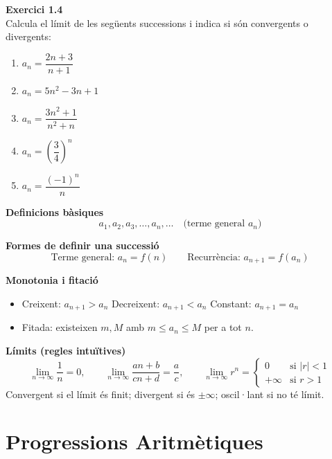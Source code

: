 \documentclass[12pt]{article}
\begin{document}
\begin{exercici}
\textbf{Exercici 1.4}\\
Calcula el límit de les següents successions i indica si són convergents o divergents:
\begin{enumerate}[label=\alph*)]
    \item $a_n = \dfrac{2n+3}{n+1}$
    \item $a_n = 5n^2 - 3n + 1$
    \item $a_n = \dfrac{3n^2 + 1}{n^2 + n}$
    \item $a_n = \left(\dfrac{3}{4}\right)^n$
    \item $a_n = \dfrac{(-1)^n}{n}$
\end{enumerate}
\end{exercici}

\begin{resum}[title=Resum 1: Successions]
\textbf{Definicions bàsiques}
\[
a_1, a_2, a_3, \dots, a_n, \dots \quad \text{(terme general } a_n\text{)}
\]

\textbf{Formes de definir una successió}
\[
\text{Terme general: } a_n = f(n) \qquad \text{Recurrència: } a_{n+1} = f(a_n)
\]

\textbf{Monotonia i fitació}
\begin{itemize}
    \item Creixent: $a_{n+1} > a_n$ \quad Decreixent: $a_{n+1} < a_n$ \quad Constant: $a_{n+1} = a_n$
    \item Fitada: existeixen $m, M$ amb $m \le a_n \le M$ per a tot $n$.
\end{itemize}

\textbf{Límits (regles intuïtives)}
\[
\lim_{n\to\infty} \dfrac{1}{n} = 0, \qquad
\lim_{n\to\infty} \dfrac{an+b}{cn+d} = \dfrac{a}{c}, \qquad
\lim_{n\to\infty} r^n = \begin{cases} 0 & \text{si } |r|<1 \\ +\infty & \text{si } r>1 \end{cases}
\]
Convergent si el límit és finit; divergent si és $\pm\infty$; oscil·lant si no té límit.
\end{resum}

\newpage

\section{Progressions Aritmètiques}
\end{document}

